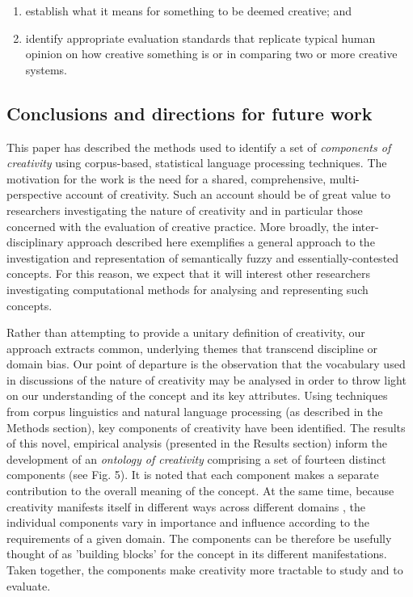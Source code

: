 \documentclass[10pt,letterpaper]{article}
\begin{document}
\begin{enumerate}
\item establish what it means for something to be deemed creative; and
\item identify appropriate evaluation standards that replicate typical human opinion on how creative something is or in comparing two or more creative systems.
\end{enumerate}




\subsection*{Conclusions and directions for future work}
\label{conclusions}


This paper has described the methods used to identify a set of {\em components of creativity} using corpus-based, statistical language processing techniques. The motivation for the work is the need for a shared, comprehensive, multi-perspective account of creativity. Such an account should be of great value to researchers investigating the nature of creativity and in particular those concerned with the evaluation of creative practice. More broadly, the inter-disciplinary approach described here exemplifies a general approach to the investigation and representation of semantically fuzzy and essentially-contested concepts. For this reason, we expect that it will interest other researchers investigating computational methods for analysing and representing such concepts.


Rather than attempting to provide a unitary definition of creativity, our approach extracts common, underlying themes that transcend discipline or domain bias. Our point of departure is the observation that the vocabulary used in discussions of the nature of creativity may be analysed in order to throw light on our understanding of the concept and its key attributes. Using techniques from corpus linguistics and natural language processing (as described in the Methods section), key components of creativity have been identified. The results of this novel, empirical analysis (presented in the Results section) inform the development of an {\em ontology of creativity\/} comprising a set of fourteen distinct components (see Fig. 5). %
It is noted that each component makes a separate contribution to the overall meaning of the concept. At the same time, because creativity manifests itself in different ways across different domains \cite{plucker04}, the individual components vary in importance and influence according to the requirements of a given domain. The components can be therefore be usefully thought of as 'building blocks' for the concept in its different manifestations. Taken together, the components make creativity more tractable to study and to evaluate. 
\end{document}
